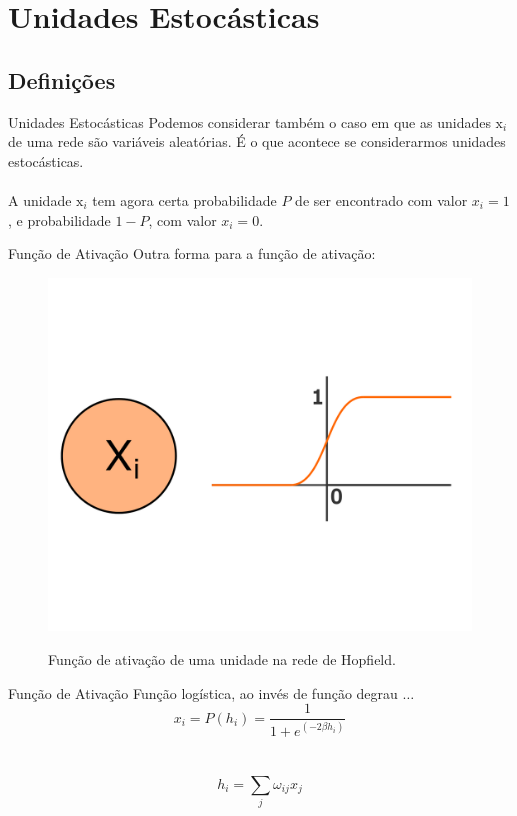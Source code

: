 \section{Unidades Estocásticas}

\subsection{Definições}
\begin{frame}{Unidades Estocásticas}%
  \justifying%
  Podemos considerar também o caso em que as unidades $\mathrm{x}_{i}$ de uma rede são variáveis aleatórias. É o que acontece se considerarmos unidades estocásticas.
  \\~\\
  A unidade $\mathrm{x}_{i}$ tem agora certa probabilidade $P$ de ser encontrado com valor $x_{i} = 1$, e probabilidade $1 - P$, com valor $x_{i} = 0$.
\end{frame}

\begin{frame}{Função de Ativação}%
  \justifying%
  Outra forma para a função de ativação:
  \begin{figure}[h]{}%
    \label{fig:stoc-activation}%
    \includegraphics[scale=0.35]{images/stochastic_activation.png}
    \caption{Função de ativação de uma unidade na rede de Hopfield.}
  \end{figure}
\end{frame}

\begin{frame}{Função de Ativação}%
  \justifying%
  Função logística, ao invés de função degrau $\dots$
  \begin{equation}%
    \label{eq:stoc-prob}
    x_{i} = P(h_{i}) = \frac{1}{1 + e^{(-2\beta h_{i})}}
  \end{equation}
  \\~\\
  \begin{equation}%
    \label{eq:hi}%
    h_{i} = \sum_{j} \omega_{ij} x_{j}
  \end{equation}
\end{frame}

